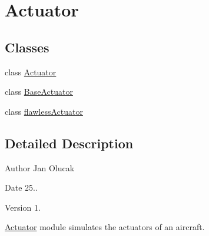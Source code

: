 \hypertarget{group___actuator}{}\section{Actuator}
\label{group___actuator}
\subsection*{Classes}
\begin{DoxyCompactItemize}
\item 
class \hyperlink{class_actuator}{Actuator}
\item 
class \hyperlink{class_base_actuator}{Base\+Actuator}
\item 
class \hyperlink{classflawless_actuator}{flawless\+Actuator}
\end{DoxyCompactItemize}


\subsection{Detailed Description}
\begin{DoxyAuthor}{Author}
Jan Olucak 
\end{DoxyAuthor}
\begin{DoxyDate}{Date}
25.. 
\end{DoxyDate}
\begin{DoxyVersion}{Version}
1.
\end{DoxyVersion}
\hyperlink{class_actuator}{Actuator} module simulates the actuators of an aircraft. 